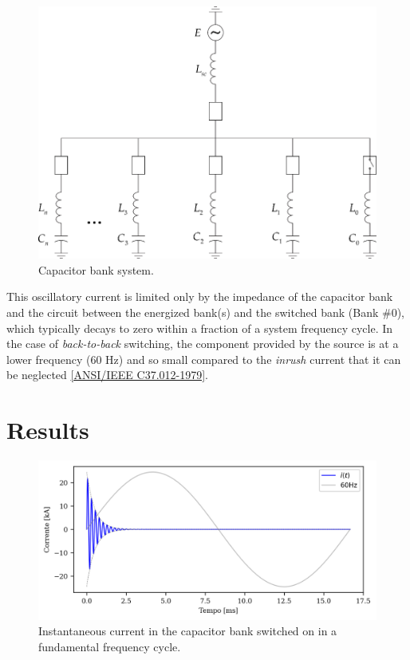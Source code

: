 \documentclass[a4paper]{article}
\begin{document}
	\begin{figure}[!hbp]
		\centering
		\includegraphics{Picture1.png}
		\caption{Capacitor bank system.}
		\label{fig:picture1}
	\end{figure}
	
	
	This oscillatory current is limited only by the impedance of the capacitor bank and the circuit between the energized bank(s) and the switched bank (Bank \#0), which typically decays to zero within a fraction of a system frequency cycle. In the case of \textit{back-to-back} switching, the component provided by the source is at a lower frequency (60 Hz) and so small compared to the \textit{inrush} current that it can be neglected \href{https://ieeexplore.ieee.org/document/7035261}{[ANSI/IEEE C37.012-1979]}.
	
	\section{Results}
	\begin{figure}[!hbp]
		\centering
		\includegraphics{Correntes.png}
		\caption{Instantaneous current in the capacitor bank switched on in a fundamental frequency cycle.}
		\label{fig:picture2}
	\end{figure}
	
\end{document}
